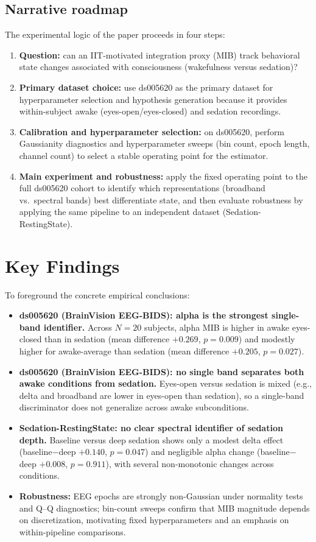 \documentclass[11pt]{article}
\begin{document}
\subsection{Narrative roadmap}
The experimental logic of the paper proceeds in four steps:
\begin{enumerate}[leftmargin=*]
    \item \textbf{Question:} can an IIT-motivated integration proxy (MIB) track behavioral state changes associated with consciousness (wakefulness versus sedation)?
    \item \textbf{Primary dataset choice:} use ds005620 as the primary dataset for hyperparameter selection and hypothesis generation because it provides within-subject awake (eyes-open/eyes-closed) and sedation recordings.
    \item \textbf{Calibration and hyperparameter selection:} on ds005620, perform Gaussianity diagnostics and hyperparameter sweeps (bin count, epoch length, channel count) to select a stable operating point for the estimator.
    \item \textbf{Main experiment and robustness:} apply the fixed operating point to the full ds005620 cohort to identify which representations (broadband vs.\ spectral bands) best differentiate state, and then evaluate robustness by applying the same pipeline to an independent dataset (Sedation-RestingState).
\end{enumerate}

\section{Key Findings}
To foreground the concrete empirical conclusions:
\begin{itemize}[leftmargin=*]
    \item \textbf{ds005620 (BrainVision EEG-BIDS): alpha is the strongest single-band identifier.} Across $N=20$ subjects, alpha MIB is higher in awake eyes-closed than in sedation (mean difference $+0.269$, $p=0.009$) and modestly higher for awake-average than sedation (mean difference $+0.205$, $p=0.027$).
    \item \textbf{ds005620 (BrainVision EEG-BIDS): no single band separates both awake conditions from sedation.} Eyes-open versus sedation is mixed (e.g., delta and broadband are lower in eyes-open than sedation), so a single-band  discriminator does not generalize across awake subconditions.
    \item \textbf{Sedation-RestingState: no clear spectral identifier of sedation depth.} Baseline versus deep sedation shows only a modest delta effect (baseline$-$deep $+0.140$, $p=0.047$) and negligible alpha change (baseline$-$deep $+0.008$, $p=0.911$), with several non-monotonic changes across conditions.
    \item \textbf{Robustness:} EEG epochs are strongly non-Gaussian under normality tests and Q--Q diagnostics; bin-count sweeps confirm that MIB magnitude depends on discretization, motivating fixed hyperparameters and an emphasis on within-pipeline comparisons.
\end{itemize}
\end{document}
